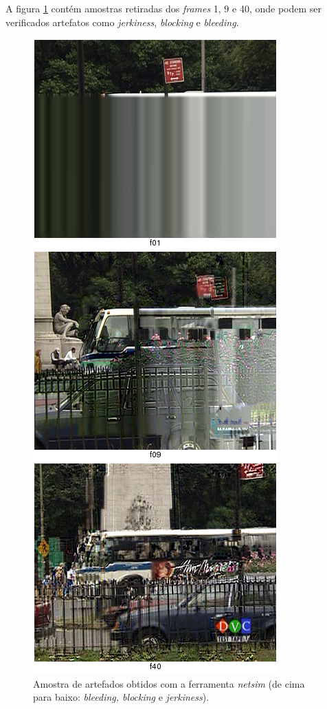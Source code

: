 A figura \ref{fig:netsim} contém amostras retiradas dos \emph{frames} 1, 9 e 40, onde podem ser verificados artefatos como \emph{jerkiness}, \emph{blocking} e \emph{bleeding}.

\begin{figure}[!htb]
	\centering
	\includegraphics[height=0.9\textheight]{./imgs/netsimresult.png}
	\caption{Amostra de artefados obtidos com a ferramenta \emph{netsim} (de cima para baixo: \emph{bleeding, blocking} e \emph{jerkiness}).}
	\label{fig:netsim}
\end{figure}

